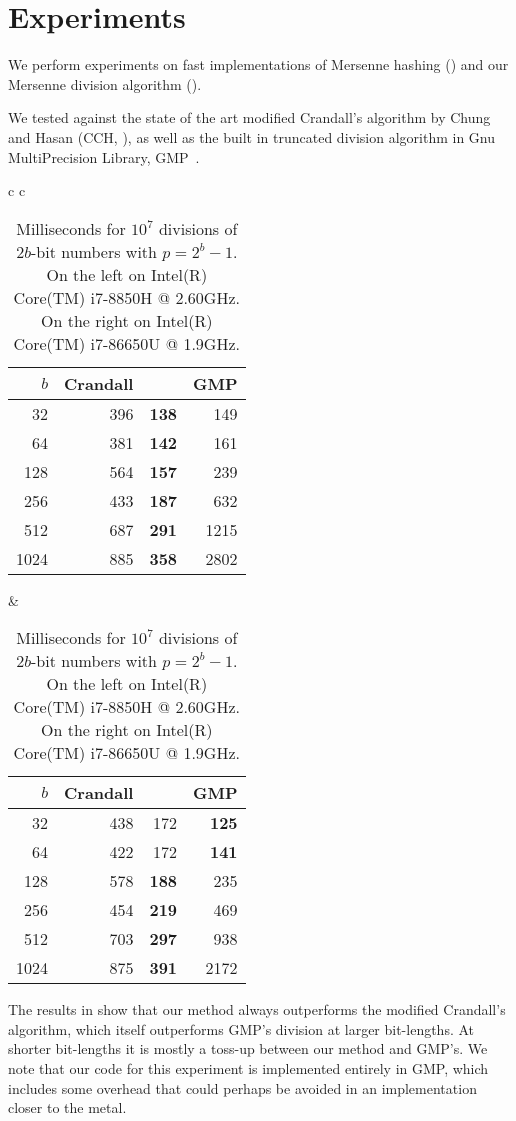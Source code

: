 \section{Experiments}
We perform experiments on fast implementations of Mersenne hashing () and our Mersenne division algorithm ().

We tested  against the state of the art modified Crandall's algorithm by Chung and Hasan (CCH, ), as well as the built in truncated division algorithm in Gnu MultiPrecision Library, GMP~\cite{granlund2010gnu}.

\begin{table}[H]
   \centering
   \begin{tabular}{ c c }
      \begin{tabular}{ r | r r r }
         $b$ & Crandall & \Cref{alg:division-generalized} & GMP \\
         \hline
         32 & 396 & \textbf   {138}  & 149\\
         64 & 381 &   \textbf {142}  & 161\\
         128 & 564 &  \textbf {157}  & 239\\
         256 & 433 &  \textbf {187}  & 632\\
         512 & 687 &  \textbf {291}  & 1215\\
         1024 & 885 & \textbf {358}  & 2802
      \end{tabular}
      \hspace{.5em}
      &
      \hspace{.5em}
      \begin{tabular}{ r | r r r }
         $b$ & Crandall & \Cref{alg:division-generalized} & GMP \\
         \hline
         32 & 438 & 172 & \textbf{125}\\
         64 & 422 & 172 & \textbf{141}\\
         128 & 578 &      \textbf{188} & 235\\
         256 & 454 &      \textbf{219} & 469\\
         512 & 703 &      \textbf{297} & 938\\
         1024 & 875 &     \textbf{391} & 2172\\

      \end{tabular}
   \end{tabular}
   \caption{Milliseconds for $10^7$ divisions of $2b$-bit numbers with $p=2^b-1$.
         On the left on Intel(R) Core(TM) i7-8850H @ 2.60GHz.
      On the right on Intel(R) Core(TM) i7-86650U @ 1.9GHz.
   }
   \label{tab:division-experiments}
\end{table}

The results in  show that our method always outperforms the modified Crandall's algorithm, which itself outperforms GMP's division at larger bit-lengths.
At shorter bit-lengths it is mostly a toss-up between our method and GMP's.
We note that our code for this experiment is implemented entirely in GMP, which includes some overhead that could perhaps be avoided in an implementation closer to the metal.
